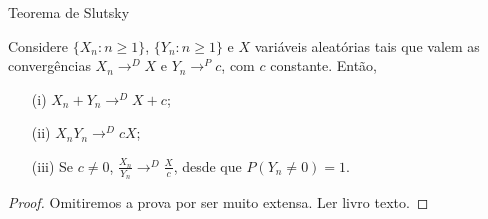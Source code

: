 %
%
%
%
%
%
%
%

\begin{frame}{Teorema de Slutsky}
\begin{teo} Considere $\{X_n:n\geq 1\}$, $\{Y_n:n\geq 1\}$ e $X$ variáveis
aleatórias tais que valem as convergências $X_n\rightarrow^D X$ e
$Y_n\rightarrow^P c$, com $c$ constante. Então,
\begin{enumerate}
\item[(i)] $X_n+Y_n\rightarrow^D X+c$;

\item[(ii)] $X_nY_n\rightarrow^D cX$;

\item[(iii)] Se $c\ne 0$, $\frac{X_n}{Y_n}\rightarrow^D
\frac{X}{c}$, desde que $P(Y_n\ne 0)=1$.
\end{enumerate}
\end{teo}
\begin{proof}
	Omitiremos a prova por ser muito extensa. Ler livro texto.
\end{proof}
\end{frame}

